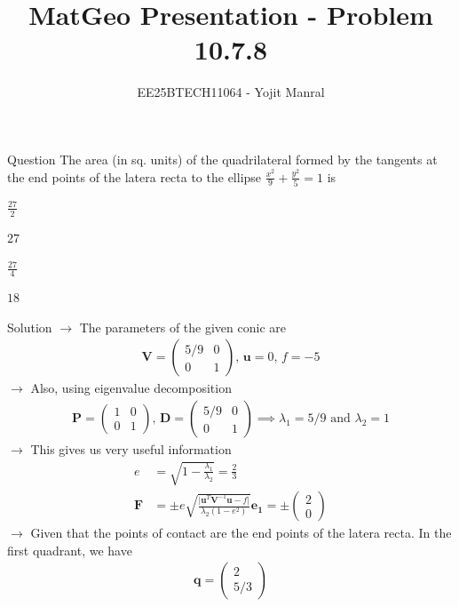 \documentclass{beamer}
\title{MatGeo Presentation - Problem 10.7.8}
\author{EE25BTECH11064 - Yojit Manral}
\date{}
\numberwithin{equation}{section}
\theoremstyle{remark}
\newcommand{\myvec}[1]{\ensuremath{\begin{pmatrix}#1\end{pmatrix}}}
\let\vec\mathbf
\begin{document}
\frame{\titlepage}
\begin{frame}{Question}
The area (in sq. units) of the quadrilateral formed by the tangents at the end points of the latera recta to the ellipse $\frac{x^2}{9} + \frac{y^2}{5} = 1$ is
\begin{enumerate}[label=(\alph*)]
\begin{multicols}{4}
    \item $\frac{27}{2}$
    \item $27$
    \item $\frac{27}{4}$
    \item $18$
\end{multicols}
\end{enumerate}
\end{frame}

\begin{frame}{Solution}
$\rightarrow$ The parameters of the given conic are
\begin{align}
    \vec{V} = \myvec{5/9&0\\0&1}\text{, } \vec{u} = 0\text{, } f = -5
\end{align}
$\rightarrow$ Also, using eigenvalue decomposition
\begin{align}
    \vec{P} = \myvec{1&0\\0&1}\text{, } \vec{D} = \myvec{5/9&0\\0&1} \implies \lambda_1 = 5/9\text{ and } \lambda_2 = 1
\end{align}
$\rightarrow$ This gives us very useful information
\begin{align}
    e &= \sqrt{1-\frac{\lambda_1}{\lambda_2}} = \frac{2}{3} \\
    \vec{F} &= \pm e\sqrt{\frac{\vert\vec{u}^T\vec{V}^{-1}\vec{u}-f\vert}{\lambda_2(1-e^2)}}\vec{e_1} = \pm\myvec{2\\0}
\end{align}
$\rightarrow$ Given that the points of contact are the end points of the latera recta. In the first quadrant, we have
\begin{align}
    \vec{q} = \myvec{2\\5/3}
\end{align}
\end{frame}
\end{document}
